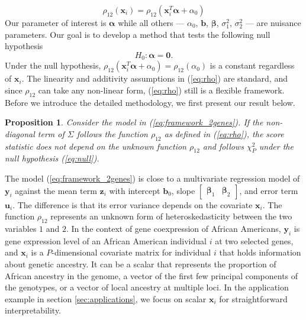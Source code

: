 \documentclass[aap,authoryear, preprint]{imsart}
\numberwithin{equation}{section}
\theoremstyle{plain}
\newtheorem{prop}{Proposition}
\begin{document}
\begin{equation}
    \rho_{12}(\bm{x}_i) = \rho_{12}(\bm{x}_i^T\bm{\alpha} + \alpha_0) \label{eq:rho}
\end{equation}
Our parameter of interest is $\bm{\alpha}$ while all others --- $\alpha_0$, $\bm{b}$, $\bm{\beta}$, $\sigma_1^2$, $\sigma_2^2$ --- are nuisance parameters. Our goal is to develop a method that tests the following null hypothesis
\begin{equation}
    H_0: \bm{\alpha} = \bm{0}.
    \label{eq:null}
\end{equation}
Under the null hypothesis, $\rho_{12}(\bm{x}_i^T\bm{\alpha} + \alpha_0) = \rho_{12}(\alpha_0)$ is a constant regardless of $\bm{x}_i$. The linearity and additivity assumptions in (\ref{eq:rho}) are standard, and since $\rho_{12}$ can take any non-linear form, (\ref{eq:rho}) still is a flexible framework. Before we introduce the detailed methodology, we first present our result below.

\begin{prop}
Consider the model in (\ref{eq:framework_2genes}). If the non-diagonal term of $\Sigma$ follows the function $\rho_{12}$ as defined in (\ref{eq:rho}), the score statistic does not depend on the unknown function $\rho_{12}$ and follows $\chi_P^2$ under the null hypothesis (\ref{eq:null}). 
\label{theorem:q}
\end{prop}

The model (\ref{eq:framework_2genes}) is close to a multivariate regression model of $\bm{y}_i$ against the mean term $\bm{z}_i$ with intercept $\bm{b}_0$, slope $\begin{bmatrix} \bm{\beta}_1 & \bm{\beta}_2 \end{bmatrix}$, and error term $\bm{u}_i$. The difference is that its error variance depends on the covariate $\bm{x}_i$. The function $\rho_{12}$ represents an unknown form of heteroskedasticity between the two variables $1$ and $2$. In the context of gene coexpression of African Americans, $\bm{y}_i$ is gene expression level of an African American individual $i$ at two selected genes, and $\bm{x}_i$ is a $P$-dimensional covariate matrix for individual $i$ that holds information about genetic ancestry. It can be a scalar that represents the proportion of African ancestry in the genome, a vector of the first few principal components of the genotypes, or a vector of local ancestry at multiple loci. In the application example in section \ref{sec:applications}, we focus on scalar $\bm{x}_i$ for straightforward interpretability. \\
\end{document}
